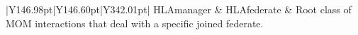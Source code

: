 \begin{landscape}
\begin{momtabletypeset}[8.00]
{{\begin{tabular}{|Y{146.98pt}|Y{146.60pt}|Y{342.01pt}|}
                    HLAmanager                                                 & HLAfederate             & Root class of MOM interactions that deal with a specific joined federate.\allowbreak{}                                                                                                                                                                                                                                                                                                                                                                                                                                                                                                                                                                                                                                                                                                                                                                                                                                                                                                                                                                                                                                                                                                                                                                                                                                                                                                                                                                                                                                                                               \\
                    \hline

\end{tabular}}}
\end{momtabletypeset}
\end{landscape}
